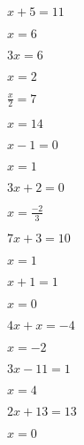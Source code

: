 \documentclass{ximera}
\begin{document}
\begin{exercise}

\begin{question} \( x+5         = 11  \) \begin{oplossing}  \( x = 6             \) \end{oplossing} \end{question}
\begin{question} \( 3x          = 6   \) \begin{oplossing}  \( x = 2             \) \end{oplossing} \end{question}
\begin{question} \( \frac{x}{2} = 7   \) \begin{oplossing}  \( x = 14            \) \end{oplossing} \end{question}
\begin{question} \( x-1         = 0   \) \begin{oplossing}  \( x = 1             \) \end{oplossing} \end{question}
\begin{question} \( 3x+2        = 0   \) \begin{oplossing}  \( x = \frac{-2}{3}  \) \end{oplossing} \end{question}
\begin{question} \( 7x+3        = 10  \) \begin{oplossing}  \( x = 1             \) \end{oplossing} \end{question}
\begin{question} \( x+1         = 1   \) \begin{oplossing}  \( x = 0             \) \end{oplossing} \end{question}
\begin{question} \( 4x+x        = -4  \) \begin{oplossing}  \( x = -2            \) \end{oplossing} \end{question}
\begin{question} \( 3x-11       = 1   \) \begin{oplossing}  \( x = 4             \) \end{oplossing} \end{question}
\begin{question} \( 2x+13       = 13  \) \begin{oplossing}  \( x = 0             \) \end{oplossing} \end{question}

\end{exercise}
\end{document}
